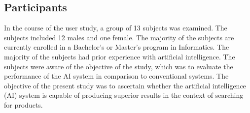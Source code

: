 \documentclass[../../submission.tex]{subfiles}
\begin{document}
\subsection{Participants}
In the course of the user study, a group of 13 subjects was examined. 
The subjects included 12 males and one female. The majority of the subjects are currently enrolled in a Bachelor's or Master's program in Informatics. 
The majority of the subjects had prior experience with artificial intelligence. 
The subjects were aware of the objective of the study, which was to evaluate the performance of the AI system in comparison to conventional systems. 
The objective of the present study was to ascertain whether the artificial intelligence (AI) system is capable of producing superior results in the context of searching for products. 
\end{document}
